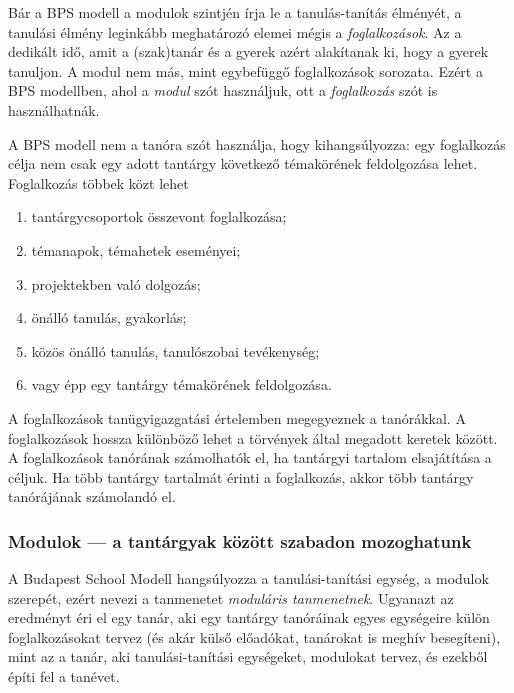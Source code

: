 Bár a BPS modell a modulok szintjén írja le a tanulás-tanítás élményét,
a tanulási élmény leginkább meghatározó elemei mégis a
\emph{foglalkozások}. Az a dedikált idő, amit a (szak)tanár és a gyerek
azért alakítanak ki, hogy a gyerek tanuljon. A modul nem más, mint
egybefüggő foglalkozások sorozata. Ezért a BPS modellben, ahol a \emph{modul}
szót használjuk, ott a \emph{foglalkozás} szót is használhatnák.

A BPS modell nem a tanóra szót használja, hogy kihangsúlyozza: egy
foglalkozás célja nem csak egy adott tantárgy következő témakörének
feldolgozása lehet. Foglalkozás többek közt lehet

\begin{enumerate}
\def\labelenumi{\arabic{enumi}.}
\tightlist
\item
  tantárgycsoportok összevont foglalkozása;
\item
  témanapok, témahetek eseményei;
\item
  projektekben való dolgozás;
\item
  önálló tanulás, gyakorlás;
\item
  közös önálló tanulás, tanulószobai tevékenység;
\item
  vagy épp egy tantárgy témakörének feldolgozása.
\end{enumerate}

A foglalkozások tanügyigazgatási értelemben megegyeznek a tanórákkal. A
foglalkozások hossza különböző lehet a törvények által megadott keretek
között. A foglalkozások tanórának számolhatók el, ha tantárgyi tartalom
elsajátítása a céljuk. Ha több tantárgy tartalmát érinti a foglalkozás,
akkor több tantárgy tanórájának számolandó el.

\hypertarget{modulok---a-tantargyak-kozott-szabadon-mozoghatunk}{%
\subsubsection{Modulok --- a tantárgyak között szabadon
mozoghatunk}\label{modulok---a-tantargyak-kozott-szabadon-mozoghatunk}}

A Budapest School Modell hangsúlyozza a tanulási-tanítási egység, a
modulok szerepét, ezért nevezi a tanmenetet \emph{moduláris
tanmenetnek}. Ugyanazt az eredményt éri el egy tanár, aki egy tantárgy
tanóráinak egyes egységeire külön foglalkozásokat tervez (és akár
külső előadókat, tanárokat is meghív besegíteni), mint az a tanár, aki
tanulási-tanítási egységeket, modulokat tervez, és ezekből építi fel a
tanévet.

